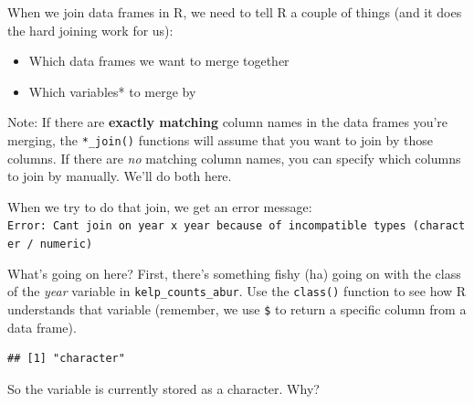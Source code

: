 \documentclass[]{book}
\newenvironment{Shaded}{\begin{snugshade}}{\end{snugshade}}
\newcommand{\CommentTok}[1]{\textcolor[rgb]{0.56,0.35,0.01}{\textit{#1}}}
\newcommand{\DecValTok}[1]{\textcolor[rgb]{0.00,0.00,0.81}{#1}}
\newcommand{\KeywordTok}[1]{\textcolor[rgb]{0.13,0.29,0.53}{\textbf{#1}}}
\newcommand{\NormalTok}[1]{#1}
\newcommand{\OperatorTok}[1]{\textcolor[rgb]{0.81,0.36,0.00}{\textbf{#1}}}
\newcommand{\StringTok}[1]{\textcolor[rgb]{0.31,0.60,0.02}{#1}}
\providecommand{\tightlist}{%
  \setlength{\itemsep}{0pt}\setlength{\parskip}{0pt}}
\begin{document}
When we join data frames in R, we need to tell R a couple of things (and it does the hard joining work for us):

\begin{itemize}
\tightlist
\item
  Which data frames we want to merge together
\item
  Which variables* to merge by
\end{itemize}

Note: If there are \textbf{exactly matching} column names in the data frames you're merging, the \texttt{*\_join()} functions will assume that you want to join by those columns. If there are \emph{no} matching column names, you can specify which columns to join by manually. We'll do both here.

\begin{Shaded}
\end{Shaded}

When we try to do that join, we get an error message:
\texttt{Error:\ Can\textquotesingle{}t\ join\ on\ \textquotesingle{}year\textquotesingle{}\ x\ \textquotesingle{}year\textquotesingle{}\ because\ of\ incompatible\ types\ (character\ /\ numeric)}

What's going on here? First, there's something fishy (ha) going on with the class of the \emph{year} variable in \texttt{kelp\_counts\_abur}. Use the \texttt{class()} function to see how R understands that variable (remember, we use \texttt{\$} to return a specific column from a data frame).

\begin{Shaded}
\end{Shaded}

\begin{verbatim}
## [1] "character"
\end{verbatim}

So the variable is currently stored as a character. Why?
\end{document}
